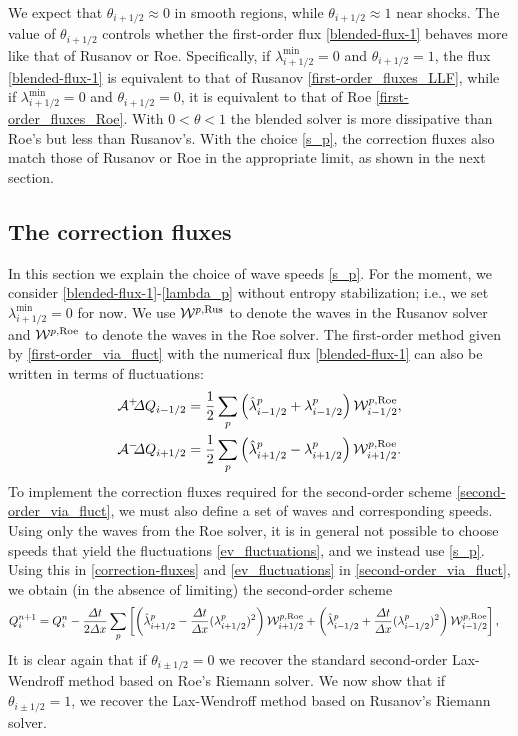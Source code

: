 \documentclass[preprint, 11pt]{article}
\newcommand{\W}{{\mathcal W}}
\newcommand{\A}{{\mathcal A}}
\newcommand{\apdq}{\A^+ \!\!{\Delta} Q}
\newcommand{\amdq}{\A^- \!\!{\Delta} Q}
\newcommand{\imh}{{i-1/2}}
\newcommand{\iph}{{i+1/2}}
\newcommand{\bfq}{{Q}}
\newcommand{\Rus}{{\rm Rus}}
\newcommand{\Roe}{{\rm Roe}}
\begin{document}
We expect that $\theta_\iph\approx 0 $ in smooth regions,
while $\theta_\iph\approx 1$ near shocks.
The value of $\theta_\iph$ controls whether the first-order flux \eqref{blended-flux-1}
behaves more like that of Rusanov or Roe.
{\color{red}
  Specifically, if $\lambda_\iph^{\min}=0$ and $\theta_\iph=1$, the flux \eqref{blended-flux-1}
  is equivalent to that of Rusanov \eqref{first-order_fluxes_LLF},
  while if $\lambda_\iph^{\min}=0$ and $\theta_\iph=0$, it is equivalent to that of Roe \eqref{first-order_fluxes_Roe}.
  With $0<\theta<1$ the blended solver is more dissipative than Roe's but less than Rusanov's.
}
With the choice \eqref{s_p}, the correction fluxes also match
those of Rusanov or Roe in the appropriate limit, as shown in the next section.

\subsection{The correction fluxes}
In this section we explain the choice of wave speeds \eqref{s_p}.
For the moment, we consider \eqref{blended-flux-1}-\eqref{lambda_p} without
entropy stabilization; i.e., we set $\lambda^{\min}_\iph=0$
for now.
We use $\W^{p,\Rus}$ to denote the waves in the Rusanov
solver and $\W^{p,\Roe}$ to denote the waves in the Roe solver.
The first-order method given by \eqref{first-order_via_fluct} with the numerical
flux \eqref{blended-flux-1} can also be written in
terms of fluctuations:
\begin{subequations}\label{ev_fluctuations}
\begin{align}
  \apdq_\imh & = \frac{1}{2}\sum_p \left(\hat\lambda_{i-1/2}^p + \lambda_{i-1/2}^p\right)\W_{i-1/2}^{p,\Roe}, \\
  \amdq_\iph & = \frac{1}{2}\sum_p \left(\hat\lambda_{i+1/2}^p - \lambda_{i+1/2}^p\right)\W_{i+1/2}^{p,\Roe}.
\end{align}
\end{subequations}
To implement the correction fluxes required for the second-order scheme \eqref{second-order_via_fluct},
we must also define a set of waves and corresponding speeds.
Using only the waves from the Roe solver, it is in general not possible
to choose speeds that yield the fluctuations \eqref{ev_fluctuations},
and we instead use \eqref{s_p}.
Using this in \eqref{correction-fluxes} and \eqref{ev_fluctuations} in 
\eqref{second-order_via_fluct}, we obtain (in the absence of limiting)
the second-order scheme
\begin{align}\label{LWL}
  \bfq_i^{n+1}=\bfq_i^n
  &-\frac{\Delta t}{2 \Delta x}
  \sum_p
  \left[\left(\hat\lambda_{i+1/2}^p -\frac{\Delta t}{\Delta x}(\lambda_{i+1/2}^p)^2 \right)\W_{i+1/2}^{p,\Roe}
  +
  \left(\hat\lambda_{i-1/2}^p +\frac{\Delta t}{\Delta x}(\lambda_{i-1/2}^p)^2 \right)\W_{i-1/2}^{p,\Roe}\right],
\end{align}
It is clear again that if $\theta_{i\pm 1/2}=0$ we recover the standard
second-order Lax-Wendroff method based on Roe's Riemann solver.
We now show that if $\theta_{i\pm 1/2}=1$, we recover the Lax-Wendroff method
based on Rusanov's Riemann solver.
\end{document}
